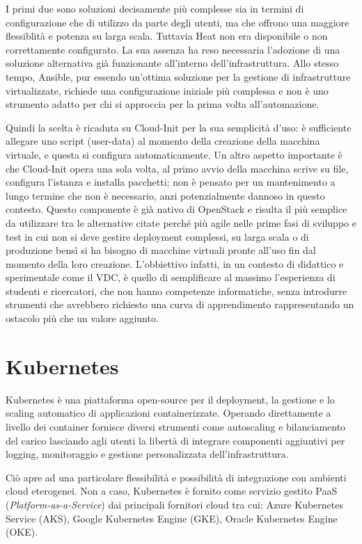 \documentclass[12pt,a4paper,openright,twoside]{book}
\begin{document}
I primi due sono soluzioni decisamente più complesse sia in termini di configurazione che di utilizzo da parte degli utenti, ma che offrono una maggiore flessiblità e potenza su larga scala.
Tuttavia Heat non era disponibile o non correttamente configurato. La sua assenza ha reso necessaria l'adozione di una soluzione alternativa già funzionante all'interno dell'infrastruttura.
Allo stesso tempo, Ansible, pur essendo un'ottima soluzione per la gestione di infrastrutture virtualizzate, richiede una configurazione iniziale più complessa e non è uno strumento adatto per chi si approccia
per la prima volta all'automazione.

Quindi la scelta è ricaduta su Cloud-Init per la sua semplicità d'uso: è sufficiente allegare uno script (user-data) al momento della creazione della macchina virtuale, e questa si configura automaticamente.
Un altro aspetto importante è che Cloud-Init opera una sola volta, al primo avvio della macchina scrive su file, configura l'istanza e installa pacchetti; non è pensato per un mantenimento a lungo termine che non è necessario,
anzi potenzialmente dannoso in questo contesto. 
Questo componente è già nativo di OpenStack e risulta il più semplice da utilizzare tra le alternative citate perché più agile nelle prime fasi di sviluppo e test in cui non si deve gestire deployment complessi, su larga scala o
di produzione bensì si ha bisogno di macchine virtuali pronte all'uso fin dal momento della loro creazione.
L'obbiettivo infatti, in un contesto di didattico e sperimentale come il VDC, è quello di semplificare al massimo l'esperienza di studenti e ricercatori, che non hanno competenze informatiche, senza introdurre strumenti che avrebbero richiesto una curva di apprendimento
rappresentando un ostacolo più che un valore aggiunto.

%
\section{Kubernetes}
\label{sec:kube}
Kubernetes è una piattaforma open-source per il deployment, la gestione e lo scaling automatico di applicazioni containerizzate. 
Operando direttamente a livello dei container fornisce diversi strumenti come autoscaling e bilanciamento del carico lasciando agli utenti la libertà di integrare componenti aggiuntivi per logging, monitoraggio e gestione personalizzata dell'infrastruttura.

Ciò apre ad una particolare flessibilità e possibilità di integrazione con ambienti cloud eterogenei. Non a caso, Kubernetes è fornito come servizio gestito PaaS (\textit{Platform-as-a-Service}) dai principali fornitori cloud tra cui: Azure Kubernetes Service (AKS), Google Kubernetes Engine (GKE), Oracle Kubernetes Engine (OKE).
\end{document}
